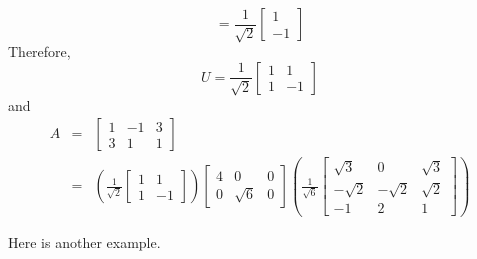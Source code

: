 \documentclass{ximera}
\begin{document}
\begin{example}
\begin{explanation}
\[=\frac{1}{\sqrt 2}\left[\begin{array}{r} 1\\ -1 \end{array}\right]
\]
Therefore,
\[ U=\frac{1}{\sqrt{2}}\left[\begin{array}{rr} 1 & 1 \\
1 & -1 \end{array}\right]\]
and
\begin{eqnarray*}
A & = & \left[\begin{array}{rrr} 1 & -1 & 3 \\ 3 & 1 & 1 \end{array}\right]\\
& = & \left(\frac{1}{\sqrt{2}}\left[\begin{array}{rr} 1 & 1 \\
1 & -1 \end{array}\right]\right)
\left[\begin{array}{rrr} 4 & 0 & 0 \\
0 & \sqrt 6 & 0 \end{array}\right]
\left(\frac{1}{\sqrt{6}}\left[\begin{array}{rrr}
\sqrt 3 & 0 & \sqrt 3  \\
-\sqrt 2 & -\sqrt 2 & \sqrt2 \\
-1 & 2 & 1 \end{array}\right]\right)
\end{eqnarray*}
\end{explanation}
\end{example}
 
 
Here is another example.
 
\end{document}
